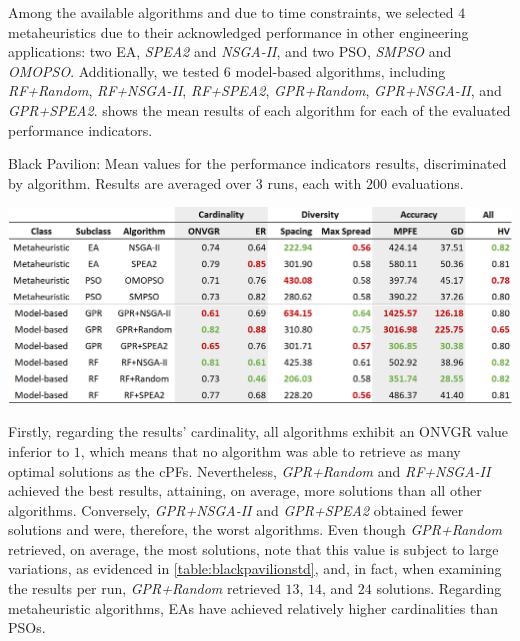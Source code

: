 Among the available algorithms and due to time constraints, we selected $4$ metaheuristics due to their acknowledged performance in other engineering applications: two \ac{EA}, \textit{SPEA2} and \textit{NSGA-II}, and two \ac{PSO}, \textit{SMPSO} and \textit{OMOPSO}. Additionally, we tested $6$ model-based algorithms, including \textit{RF+Random}, \textit{RF+NSGA-II}, \textit{RF+SPEA2}, \textit{GPR+Random}, \textit{GPR+NSGA-II}, and \textit{GPR+SPEA2}.  shows the mean results of each algorithm for each of the evaluated performance indicators. 

\begin{table}[]
	\centering
	\caption[Black Pavilion: Mean values for the performance indicators results, discriminated by algorithm]{Black Pavilion: Mean values for the performance indicators results, discriminated by algorithm. Results are averaged over $3$ runs, each with $200$ evaluations.}
	\label{table:blackpavilion}
	\includegraphics[width=\textwidth]{Images/Evaluation/BlackPavilion/Results_Mean_20190428.PNG}
\end{table}

Firstly, regarding the results' cardinality, all algorithms exhibit an \ac{ONVGR} value inferior to $1$, which means that no algorithm was able to retrieve as many optimal solutions as the \acp{cPF}. Nevertheless, \textit{GPR+Random} and \textit{RF+NSGA-II} achieved the best results, attaining, on average, more solutions than all other algorithms. Conversely, \textit{GPR+NSGA-II} and \textit{GPR+SPEA2} obtained fewer solutions and were, therefore, the worst algorithms. Even though \textit{GPR+Random} retrieved, on average, the most solutions, note that this value is subject to large variations, as evidenced in \cref{table:blackpavilionstd}, and, in fact, when examining the results per run, \textit{GPR+Random} retrieved $13$, $14$, and $24$ solutions. Regarding metaheuristic algorithms, \acp{EA} have achieved relatively higher cardinalities than \acp{PSO}. 

